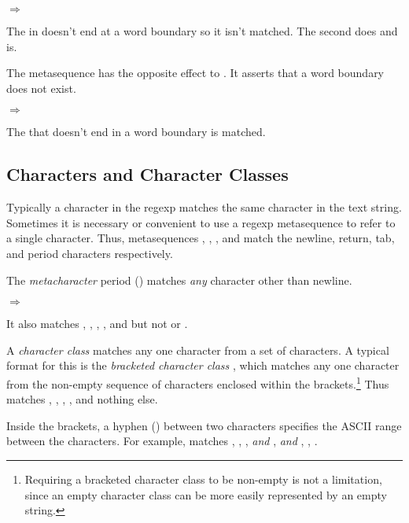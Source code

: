  $\Rightarrow$ 

The  in  doesn't end at a word boundary so it
isn't matched.  The second  does and is.

The metasequence  has the opposite effect to
.  It asserts that a word boundary does not
exist.

 $\Rightarrow$ 

The  that doesn't end in a word boundary is matched.

\subsection {Characters and Character Classes}

Typically a character in the regexp matches the same character in the
text string.  Sometimes it is necessary or convenient to use a regexp
metasequence to refer to a single character.  Thus, metasequences
, ,
, and   match the
newline, return, tab, and period characters respectively.

The \emph{metacharacter} period () matches \emph{any}
character other than newline.

 $\Rightarrow$ 

It also matches , , , , and
 but not  or .

A \emph{character class} matches any one character from a set of
characters. A typical format for this is the \emph{bracketed character
  class} \code{[}\etc\code{]}, which matches any one character from
the non-empty sequence of characters enclosed within the
brackets.\footnote{Requiring a bracketed character class to be
  non-empty is not a limitation, since an empty character class can be
  more easily represented by an empty string.}  Thus
 matches , , ,
,  and nothing else.

Inside the brackets, a hyphen (\code{-}) between two characters
specifies the ASCII range between the characters.  For example,
 matches , , ,
\emph{and} , \emph{and} , , .

